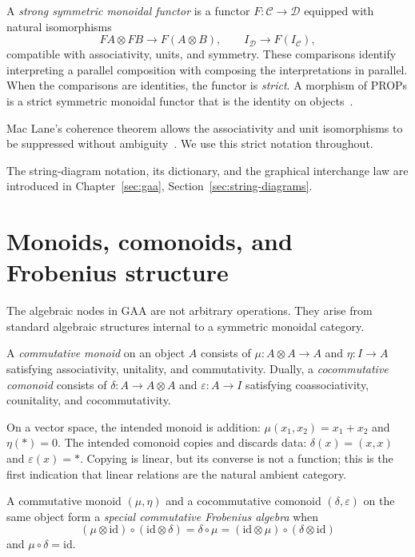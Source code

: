 \begin{definition}\label{appendix:monoidal-functor}
A \emph{strong symmetric monoidal functor} is a functor
$F:\mathcal C\to\mathcal D$ equipped with natural isomorphisms
\[
 FA\otimes FB\longrightarrow F(A\otimes B),
 \qquad I_{\mathcal D}\longrightarrow F(I_{\mathcal C}),
\]
compatible with associativity, units, and symmetry. These comparisons identify
interpreting a parallel composition with composing the interpretations in
parallel. When the comparisons are identities, the functor is \emph{strict}.
A morphism of PROPs is a strict symmetric monoidal functor that is the identity
on objects~\cite{maclane1998categories,bonchi2017interacting}.
\end{definition}

Mac Lane's coherence theorem allows the associativity and unit isomorphisms to
be suppressed without ambiguity~\cite{maclane1998categories}.  We use this
strict notation throughout.

The string-diagram notation, its dictionary, and the graphical interchange law
are introduced in Chapter~\ref{sec:gaa}, Section~\ref{sec:string-diagrams}.

\section{Monoids, comonoids, and Frobenius structure}\label{appendix:frobenius}

The algebraic nodes in GAA are not arbitrary operations.  They arise from
standard algebraic structures internal to a symmetric monoidal category.

\begin{definition}
A \emph{commutative monoid} on an object $A$ consists of
$\mu:A\otimes A\to A$ and $\eta:I\to A$ satisfying associativity, unitality,
and commutativity.  Dually, a \emph{cocommutative comonoid} consists of
$\delta:A\to A\otimes A$ and $\varepsilon:A\to I$ satisfying coassociativity,
counitality, and cocommutativity.
\end{definition}

On a vector space, the intended monoid is addition:
$\mu(x_1,x_2)=x_1+x_2$ and $\eta(*)=0$.  The intended comonoid copies and
discards data:
$\delta(x)=(x,x)$ and $\varepsilon(x)=*$.  Copying is linear, but its converse
is not a function; this is the first indication that linear relations are the
natural ambient category.

\begin{definition}
A commutative monoid $(\mu,\eta)$ and a cocommutative comonoid
$(\delta,\varepsilon)$ on the same object form a \emph{special commutative
Frobenius algebra} when
\[
 (\mu\otimes\mathrm{id})\circ(\mathrm{id}\otimes\delta)
 =\delta\circ\mu
 =(\mathrm{id}\otimes\mu)\circ(\delta\otimes\mathrm{id})
\]
and $\mu\circ\delta=\mathrm{id}$.
\end{definition}

